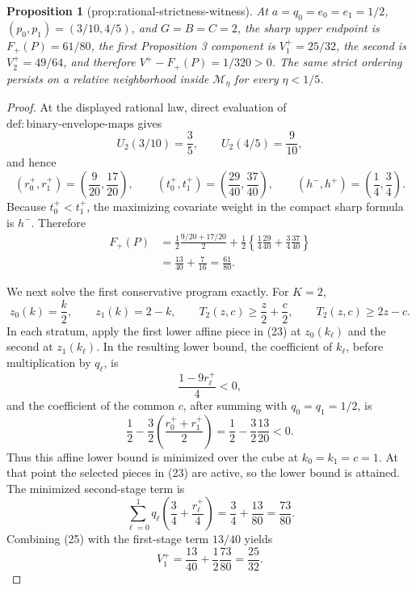 \documentclass{article}
\newtheorem{proposition}{Proposition}
\begin{document}
\begin{proposition}[prop:rational-strictness-witness]\label{prop:rational-strictness-witness}
At \(a=q_0=e_0=e_1=1/2\), \((p_0,p_1)=(3/10,4/5)\), and \(G=B=C=2\), the sharp upper endpoint is \(F_+(P)=61/80\), the first Proposition 3 component is \(V_1^+=25/32\), the second is \(V_2^+=49/64\), and therefore \(V^+-F_+(P)=1/320>0\). The same strict ordering persists on a relative neighborhood inside \(\mathcal M_\eta\) for every \(\eta<1/5\).
\end{proposition}
\begin{proof}
At the displayed rational law, direct evaluation of
\(\mathrm{def{:}binary\text{-}envelope\text{-}maps}\) gives
\[
 U_2(3/10)=\frac35,\qquad U_2(4/5)=\frac9{10},
\]
and hence
\[
 (r_0^+,r_1^+)=\left(\frac9{20},\frac{17}{20}\right),\qquad
 (t_0^+,t_1^+)=\left(\frac{29}{40},\frac{37}{40}\right),
 \qquad (h^-,h^+)=\left(\frac14,\frac34\right).               \tag{21}
\]
Because \(t_0^+<t_1^+\), the maximizing covariate weight in the compact
sharp formula is \(h^-\).  Therefore
\[
 \begin{aligned}
 F_+(P)
 &=\frac12\frac{9/20+17/20}{2}
   +\frac12\left\{\frac14\frac{29}{40}
                    +\frac34\frac{37}{40}\right\}\\
 &=\frac{13}{40}+\frac7{16}=\frac{61}{80}.                    \tag{22}
 \end{aligned}
\]

We next solve the first conservative program exactly.  For \(K=2\),
\[
 z_0(k)=\frac{k}{2},\qquad z_1(k)=2-k,
 \qquad
 T_2(z,c)\geq\frac z2+\frac c2,
 \qquad T_2(z,c)\geq2z-c.                                    \tag{23}
\]
In each stratum, apply the first lower affine piece in (23) at
\(z_0(k_\ell)\) and the second at \(z_1(k_\ell)\).  In the resulting
lower bound, the coefficient of \(k_\ell\), before multiplication by
\(q_\ell\), is
\[
 \frac{1-9r_\ell^+}{4}<0,
\]
and the coefficient of the common \(c\), after summing with
\(q_0=q_1=1/2\), is
\[
 \frac12-\frac32\left(\frac{r_0^++r_1^+}{2}\right)
 =\frac12-\frac32\frac{13}{20}<0.                              \tag{24}
\]
Thus this affine lower bound is minimized over the cube at
\(k_0=k_1=c=1\).  At that point the selected pieces in (23) are active,
so the lower bound is attained.  The minimized second-stage term is
\[
 \sum_{\ell=0}^1q_\ell\left(\frac34+\frac{r_\ell^+}{4}\right)
 =\frac34+\frac{13}{80}=\frac{73}{80}.                         \tag{25}
\]
Combining (25) with the first-stage term \(13/40\) yields
\[
 V_1^+=\frac{13}{40}+\frac12\frac{73}{80}=\frac{25}{32}.       \tag{26}
\]


\end{proof}
\end{document}
